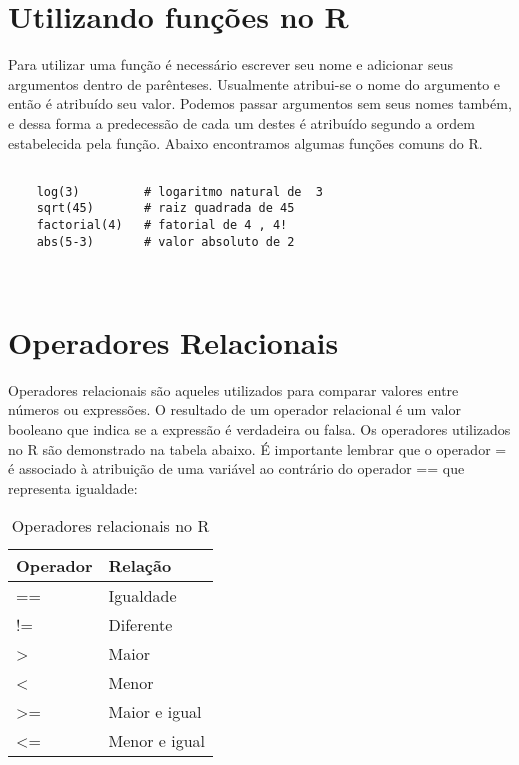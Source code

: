 \section{Utilizando funções no R}

Para utilizar uma função é necessário escrever seu nome e adicionar seus argumentos dentro de parênteses. Usualmente atribui-se o nome do argumento e então é atribuído seu valor. Podemos passar argumentos sem seus nomes também, e dessa forma a predecessão de cada um destes é atribuído segundo a ordem estabelecida pela função. Abaixo encontramos algumas funções comuns do R.

\begin{scriptsize}
	\estiloR
	\begin{lstlisting}[caption={Operacoes matemáticas convencionais utilizando o R}, label=lst:rcode]
	
	log(3)         # logaritmo natural de  3 
	sqrt(45)       # raiz quadrada de 45 
	factorial(4)   # fatorial de 4 , 4!
	abs(5-3)       # valor absoluto de 2  
	
	
	\end{lstlisting}
\end{scriptsize}

\section{Operadores Relacionais} 

Operadores relacionais são aqueles utilizados para comparar valores entre números ou expressões. O resultado de um operador relacional é um valor booleano que indica se a expressão é verdadeira ou falsa. Os operadores utilizados no R são demonstrado na tabela abaixo. É importante lembrar que o operador = é associado à atribuição de uma variável ao contrário do operador == que representa igualdade: 

\FloatBarrier
\begin{table}[]
	\centering
	\begin{tabular}{@{}ll@{}}
		\toprule
		Operador & Relação \\ \midrule
		== & Igualdade \\
		!= & Diferente \\
		> & Maior \\
		< & Menor \\
		>= & Maior e igual \\
		<= & Menor e igual \\ \bottomrule
	\end{tabular}
	\caption{Operadores relacionais no R}
	\label{tab:my-table}
\end{table}
\FloatBarrier

